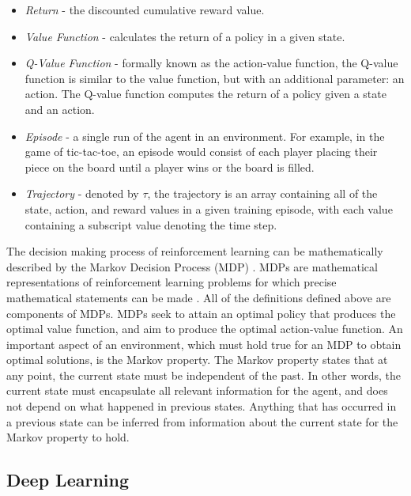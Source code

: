 \documentclass[12pt]{article}
\begin{document}
\begin{itemize}
    \item \textit{Return} - the discounted cumulative reward value.
    
    \item \textit{Value Function} - calculates the return of a policy in a given state.
    
    \item \textit{Q-Value Function} - formally known as the action-value function, the Q-value function is similar to the value function, but with an additional parameter: an action.  The Q-value function computes the return of a policy given a state and an action.
    
    \item \textit{Episode} - a single run of the agent in an environment.  For example, in the game of tic-tac-toe, an episode would consist of each player placing their piece on the board until a player wins or the board is filled.
    
    \item \textit{Trajectory} - denoted by $\tau$, the trajectory is an array containing all of the state, action, and reward values in a given training episode, with each value containing a subscript value denoting the time step.  

\end{itemize}

The decision making process of reinforcement learning can be mathematically described by the Markov Decision Process (MDP) \cite{sutton_barto_2018}. MDPs are mathematical representations of reinforcement learning problems for which precise mathematical statements can be made \cite{sutton_barto_2018}.  All of the definitions defined above are components of MDPs.  MDPs seek to attain an optimal policy that produces the optimal value function, and aim to produce the optimal action-value function.  An important aspect of an environment, which must hold true for an MDP to obtain optimal solutions, is the Markov property. The Markov property states that at any point, the current state must be independent of the past.  In other words, the current state must encapsulate all relevant information for the agent, and does not depend on what happened in previous states.  Anything that has occurred in a previous state can be inferred from information about the current state for the Markov property to hold.

%
%
\subsection*{Deep Learning}
\end{document}
